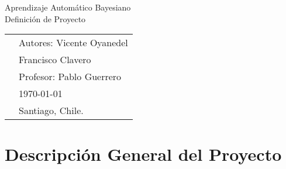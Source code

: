 \documentclass[letterpaper,11pt, spanish]{article}
\begin{document}
\onehalfspace{}


\newpage
\pagestyle{fancy}
\fancyhf{}
\vspace*{6cm}
\begin{center}
\Huge  {Aprendizaje Automático Bayesiano}\\
\vspace{1cm}
\huge {Definición de Proyecto} \\
\end{center}
\vfill
\begin{flushright}
\begin{tabular}{ll}
& Autores: Vicente Oyanedel \\
& 			Francisco Clavero \\
& Profesor: Pablo Guerrero \\
& \today \\
& Santiago, Chile.
\end{tabular}
\end{flushright}

\newpage
\pagestyle{fancy}
\fancyhf{}



\fancyfoot[R]{\small \rm \textit{\thepage}} %

\renewcommand{\sectionmark}[1]{\markright{\thesection.\ #1}}
\renewcommand{\headrulewidth}{0.5pt}
\renewcommand{\footrulewidth}{0.5pt}


\tableofcontents

\newpage
\section{Descripción General del Proyecto}
\end{document}
